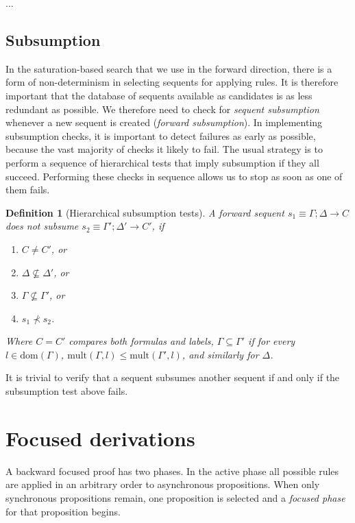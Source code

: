 \documentclass{article}
\newtheorem{definition}{Definition}
\begin{document}
...

\subsection{Subsumption}

In the saturation-based search that we use in the forward direction, there is a
form of non-determinism in selecting sequents for applying rules. It is
therefore important that the database of sequents available as candidates is as
less redundant as possible. We therefore need to check for \emph{sequent
  subsumption} whenever a new sequent is created (\emph{forward
  subsumption}). In implementing subsumption checks, it is important to detect
failures as early as possible, because the vast majority of checks it likely to
fail. The usual strategy is to perform a sequence of hierarchical tests that
imply subsumption if they all succeed. Performing these checks in sequence
allows us to stop as soon as one of them fails.

\begin{definition}[Hierarchical subsumption tests]
  A forward sequent $s_1 \equiv \Gamma; \Delta \longrightarrow C$ does not
  subsume $s_2 \equiv \Gamma'; \Delta' \longrightarrow C'$, if

  \begin{enumerate}
  \item $C \neq C'$, or
  \item $\Delta \not \subseteq \Delta'$, or
  \item $\Gamma \not \subseteq \Gamma'$, or
  \item $s_1 \not \prec s_2$.
  \end{enumerate}

  Where $C = C'$ compares both formulas and labels, $\Gamma \subseteq \Gamma'$
  if for every $l \in \mathrm{dom}(\Gamma)$,
  $\mathrm{mult}(\Gamma, l) \leq \mathrm{mult}(\Gamma', l)$, and similarly for
  $\Delta$.
\end{definition}

It is trivial to verify that a sequent subsumes another sequent if and only if
the subsumption test above fails.

\section{Focused derivations}

A backward focused proof has two phases. In the active phase all possible rules
are applied in an arbitrary order to asynchronous propositions. When only
synchronous propositions remain, one proposition is selected and a \emph{focused
  phase} for that proposition begins.
\end{document}
